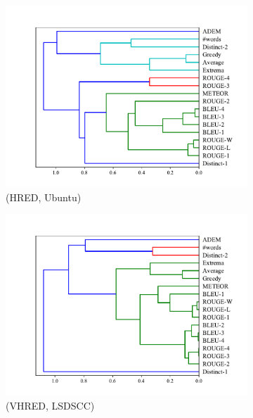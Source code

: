 \begin{figure}[htb]
\begin{subfigure}{0.40\linewidth}
        \includegraphics[width=\linewidth]{figure/plot/hierarchy/v2/pearson/hred/ubuntu/plot.pdf}
        \caption{(HRED, Ubuntu)}
    \end{subfigure}
    \begin{subfigure}{0.40\linewidth}
        \centering
        \includegraphics[width=\linewidth]{figure/plot/hierarchy/v2/pearson/vhred/lsdscc/plot.pdf}
        \caption{(VHRED, LSDSCC)}
    \end{subfigure}%
    \begin{subfigure}{0.40\linewidth}
        \centering

\end{subfigure}
\end{figure}
